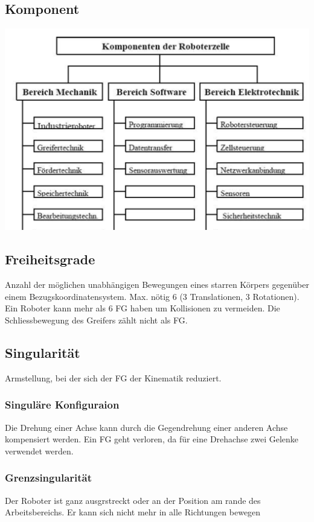 \begin{minipage}{0.5\linewidth}
    \subsection{Komponent}
    \includegraphics[width=\linewidth]{./bilder/komponent}
    
\end{minipage}
\begin{minipage}{0.5\linewidth}
    \vspace{-0.5cm}
    \subsection{Freiheitsgrade }
    Anzahl der möglichen unabhängigen Bewegungen eines starren Körpers gegenüber einem Bezugskoordinatensystem. Max. nötig 6 (3 Translationen, 3 Rotationen). Ein Roboter kann mehr als 6 FG haben um Kollisionen zu vermeiden. Die Schliessbewegung des Greifers zählt nicht als FG.
    
    \subsection{Singularität }
    Armstellung, bei der sich der FG der Kinematik reduziert.
    \subsubsection{Singuläre Konfiguraion}
    Die Drehung einer Achse kann durch die Gegendrehung einer anderen Achse kompensiert werden.
    Ein FG geht verloren, da für eine Drehachse zwei Gelenke verwendet werden.
    \subsubsection{Grenzsingularität}
    Der Roboter ist ganz ausgrstreckt oder an der Position am rande des Arbeitsbereichs. Er kann sich nicht mehr in alle Richtungen bewegen
\end{minipage}

